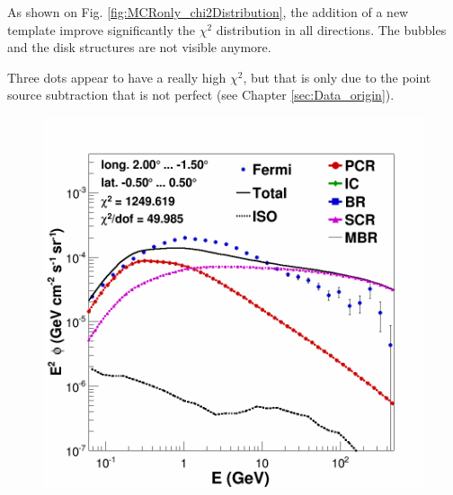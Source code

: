 As shown on Fig. \ref{fig:MCRonly_chi2Distribution}, the addition of a new template improve significantly the $\chi^2$ distribution in all directions. The bubbles and the disk structures are not visible anymore.

Three dots appear to have a really high $\chi^2$, but that is only due to the point source subtraction that is not perfect (see Chapter \ref{sec:Data_origin}).

\begin{figure}[h]
  \centering
  
  \begin{minipage}[h]{0.45\textwidth}
	  \centering
	  \includegraphics[width=\linewidth]{pic/results/SCRonly_CMZ.png}	  
	  \label{fig:SCRonly_CMZ}
  \end{minipage}
  \hfill
  \begin{minipage}[h]{0.45\textwidth}
	  \centering

\end{minipage}
\end{figure}
